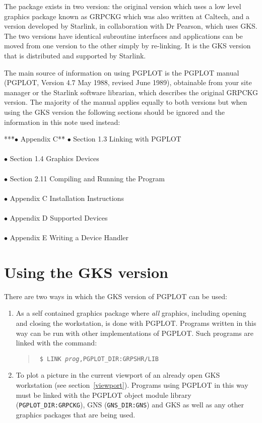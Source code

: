 The package exists in two version: the original version which uses a low
level graphics package known as GRPCKG which was also written at Caltech,
and a version developed by Starlink, in collaboration with Dr Pearson, which
uses GKS. The two versions have identical subroutine interfaces and
applications can be moved from one version to the other simply by re-linking.
It is the GKS version that is distributed and supported by Starlink.

The main source of information on using PGPLOT is the PGPLOT manual (PGPLOT,
Version 4.7 May 1988, revised June 1989), obtainable
from your site manager or the Starlink software librarian, which describes the
original GRPCKG version. The majority of the manual applies equally to both
versions but when using the GKS version the following sections should be
ignored and the information in this note used instead:
\begin{tabbing}
***\=$\bullet$ Appendix  C**\= \kill
\>$\bullet$ Section 1.3 \>Linking with PGPLOT \\
\\
\>$\bullet$ Section 1.4 \>Graphics Devices \\
\\
\>$\bullet$ Section 2.11 \>Compiling and Running the Program \\
\\
\>$\bullet$ Appendix C \>Installation Instructions \\
\\
\>$\bullet$ Appendix D \>Supported Devices \\
\\
\>$\bullet$ Appendix E \>Writing a Device Handler
\end{tabbing}

\section{Using the GKS version}

There are two ways in which the GKS version of PGPLOT can be used:
     
\begin{enumerate}
\item As a self contained graphics package where {\em all} graphics, including
opening and closing the workstation, is done with PGPLOT. Programs written in
this way can be run with other implementations of PGPLOT. Such programs
are linked with the command:
\begin{quote}\tt
\$ LINK {\em prog},PGPLOT_DIR:GRPSHR/LIB
\end{quote}

\item To plot a picture in the current viewport of an already open GKS
workstation (see section~\ref{viewport}). Programs using PGPLOT in this way must
be linked with the PGPLOT object module library ({\tt PGPLOT_DIR:GRPCKG}), GNS
({\tt GNS_DIR:GNS}) and
GKS as well as any other graphics packages that are being used. 
\end{enumerate}

